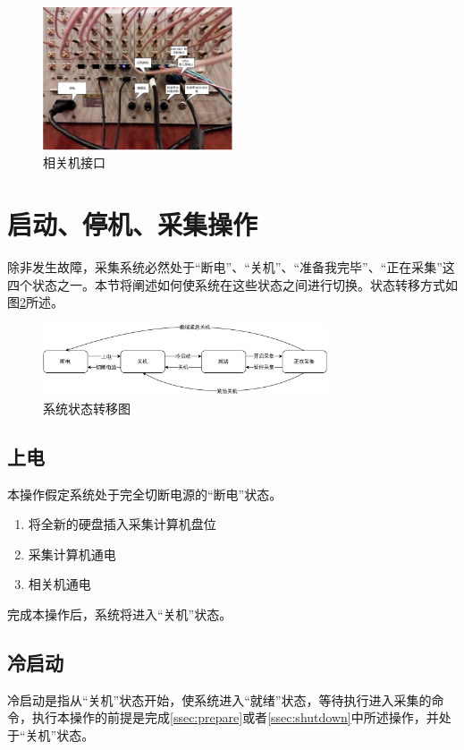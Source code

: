 \documentclass[11pt,includemp,a4paper]{article}
\begin{document}
\begin{figure}
    \begin{center}
        \includegraphics[width=0.5\textwidth]{port.pdf}
    \end{center}
    \caption{\label{fig:daq_port}相关机接口}
\end{figure}


\section{启动、停机、采集操作}
除非发生故障，采集系统必然处于“断电”、“关机”、“准备我完毕”、“正在采集”这四个状态之一。本节将阐述如何使系统在这些状态之间进行切换。状态转移方式如图\ref{fig:states}所述。
\begin{figure}
    \begin{center}
        \includegraphics[width=0.75\textwidth]{state_diag.pdf}
    \end{center}
    \caption{\label{fig:states}系统状态转移图}
\end{figure}
\subsection{上电}
本操作假定系统处于完全切断电源的“断电”状态。
\label{ssec:prepare}
\begin{enumerate}
    \item 将全新的硬盘插入采集计算机盘位
    \item 采集计算机通电
    \item 相关机通电
\end{enumerate}
完成本操作后，系统将进入“关机”状态。

\subsection{冷启动}
\label{ssec:cold_start}
冷启动是指从“关机”状态开始，使系统进入“就绪”状态，等待执行进入采集的命令，执行本操作的前提是完成\ref{ssec:prepare}或者\ref{ssec:shutdown}中所述操作，并处于“关机”状态。
\end{document}
